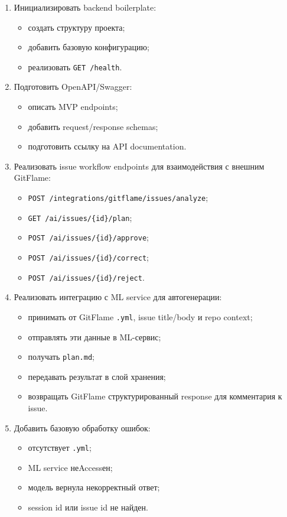 \documentclass[12pt,a4paper]{article}
\begin{document}
\begin{enumerate}
    \item Инициализировать backend boilerplate:
    \begin{itemize}
        \item создать структуру проекта;
        \item добавить базовую конфигурацию;
        \item реализовать \texttt{GET /health}.
    \end{itemize}

    \item Подготовить OpenAPI/Swagger:
    \begin{itemize}
        \item описать MVP endpoints;
        \item добавить request/response schemas;
        \item подготовить ссылку на API documentation.
    \end{itemize}

    \item Реализовать issue workflow endpoints для взаимодействия с внешним GitFlame:
    \begin{itemize}
        \item \texttt{POST /integrations/gitflame/issues/analyze};
        \item \texttt{GET /ai/issues/\{id\}/plan};
        \item \texttt{POST /ai/issues/\{id\}/approve};
        \item \texttt{POST /ai/issues/\{id\}/correct};
        \item \texttt{POST /ai/issues/\{id\}/reject}.
    \end{itemize}

    \item Реализовать интеграцию с ML service для автогенерации:
    \begin{itemize}
        \item принимать от GitFlame \texttt{.yml}, issue title/body и repo context;
        \item отправлять эти данные в ML-сервис;
        \item получать \texttt{plan.md};
        \item передавать результат в слой хранения;
        \item возвращать GitFlame структурированный response для комментария к issue.
    \end{itemize}

    \item Добавить базовую обработку ошибок:
    \begin{itemize}
        \item отсутствует \texttt{.yml};
        \item ML service неAccessен;
        \item модель вернула некорректный ответ;
        \item session id или issue id не найден.
    \end{itemize}
\end{enumerate}
\end{document}
